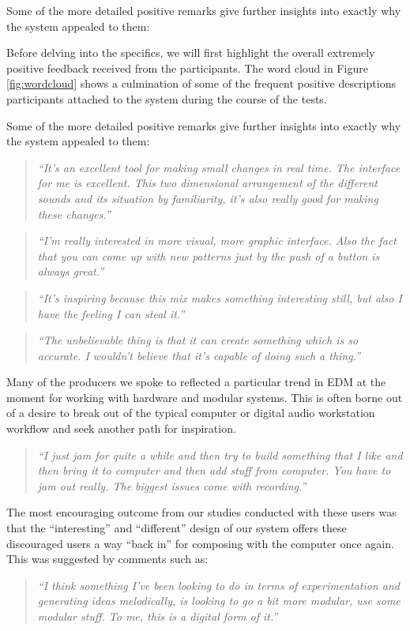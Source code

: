 Some of the more detailed positive remarks give further insights into exactly why the system appealed to them:

Before delving into the specifics, we will first highlight the overall extremely positive feedback received from the participants. The word cloud in Figure \ref{fig:wordcloud} shows a culmination of some of the frequent positive descriptions participants attached to the system during the course of the tests.

Some of the more detailed positive remarks give further insights into exactly why the system appealed to them:

\blockquote{\textit{“It's an excellent tool for making small changes in real time. The interface for me is excellent. This two dimensional arrangement of the different sounds and its situation by familiarity, it's also really good for making these changes.”}}

\blockquote{\textit{“I'm really interested in more visual, more graphic interface. Also the fact that you can come up with new patterns just by the push of a button is always great.”}}

\blockquote{\textit{“It's inspiring because this mix makes something interesting still, but also I have the feeling I can steal it.”}}

\blockquote{\textit{“The unbelievable thing is that it can create something which is so accurate. I wouldn't believe that it's capable of doing such a thing.”}}

Many of the producers we spoke to reflected a particular trend in EDM at the moment for working with hardware and modular systems. This is often borne out of a desire to break out of the typical computer or digital audio workstation workflow and seek another path for inspiration.

\blockquote{\textit{“I just jam for quite a while and then try to build something that I like and then bring it to computer and then add stuff from computer. You have to jam out really. The biggest issues come with recording.”}}

The most encouraging outcome from our studies conducted with these users was that the “interesting” and “different” design of our system offers these discouraged users a way “back in” for composing with the computer once again. This was suggested by comments such as:

\blockquote{\textit{“I think something I've been looking to do in terms of experimentation and generating ideas melodically, is looking to go a bit more modular, use some modular stuff. To me, this is a digital form of it.”}}


